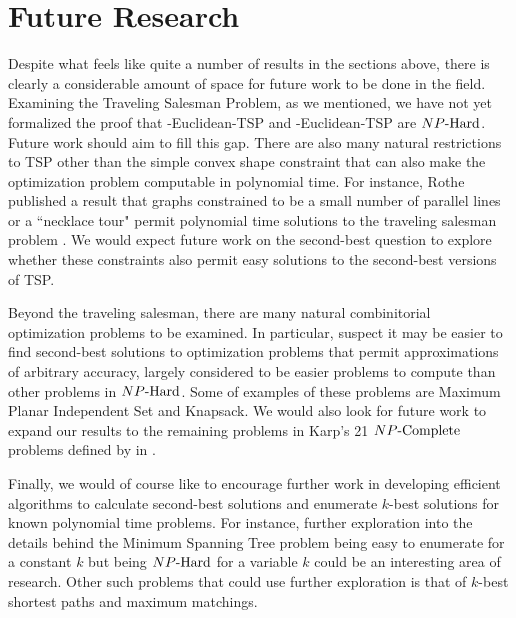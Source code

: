 \chapter{Future Research}
Despite what feels like quite a number of results in the sections above, there is clearly a considerable amount of space for future work to be done in the field. 
Examining the Traveling Salesman Problem, as we mentioned, we have not yet formalized the proof that \exob{}-Euclidean-TSP and \inob{}-Euclidean-TSP are ${NP\text{-Hard{}}}$. Future work should aim to fill this gap. There are also many natural restrictions to TSP other than the simple convex shape constraint that can also make the optimization problem computable in polynomial time. For instance, Rothe published a result that graphs constrained to be a small number of parallel lines or a ``necklace tour" permit polynomial time solutions to the traveling salesman problem \cite{rothe1988two}. We would expect future work on the second-best question to explore whether these constraints also permit easy solutions to the second-best versions of TSP.

Beyond the traveling salesman, there are many natural combinitorial optimization problems to be examined. In particular, suspect it may be easier to find second-best solutions to optimization problems that permit approximations of arbitrary accuracy, largely considered to be easier problems to compute than other problems in ${NP\text{-Hard{}}}$. Some of examples of these problems are Maximum Planar Independent Set and Knapsack. We would also look for future work to expand our results to the remaining problems in Karp's 21 ${NP\text{-Complete}}{}$ problems defined by in \cite{karp1972reducibility}.

Finally, we would of course like to encourage further work in developing efficient algorithms to calculate second-best solutions and enumerate $k$-best solutions for known polynomial time problems. For instance, further exploration into the details behind the Minimum Spanning Tree problem being easy to enumerate for a constant $k$ but being ${NP\text{-Hard{}}}$ for a variable $k$ could be an interesting area of research. Other such problems that could use further exploration is that of $k$-best shortest paths and maximum matchings.
